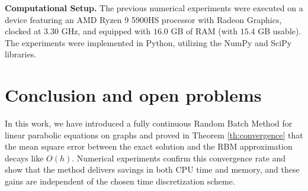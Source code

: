 \documentclass[10pt,a4paper]{amsart}
\begin{document}
\begin{table}[htbp]
\centering
\caption{Performance RBM with $\theta$-method and SIEM, using decomposition \eqref{eq:decompostion2}.}\label{table:rbm_dec2_theta_siem}
\end{table}



\noindent
\textbf{Computational Setup.} The previous numerical experiments were executed on a device featuring an AMD Ryzen 9 5900HS processor with Radeon Graphics, clocked at $3.30$ GHz, and equipped with $16.0$ GB of RAM (with $15.4$ GB usable). The experiments were implemented in Python, utilizing the NumPy and SciPy libraries.


\section{Conclusion and open problems}
In this work, we have introduced a fully continuous Random Batch Method for linear parabolic equations on graphs and proved in Theorem \ref{th:convergence} that the mean square error between the exact solution and the RBM approximation decays like $O(h)$. Numerical experiments confirm this convergence rate and show that the method delivers savings in both CPU time and memory, and these gains are independent of the chosen time discretization scheme.
\end{document}
